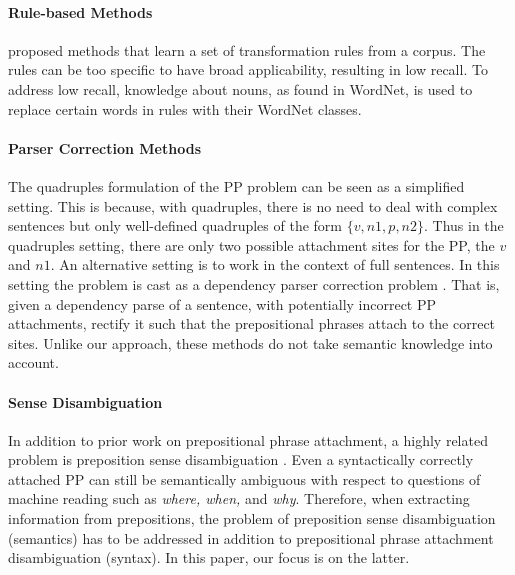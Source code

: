 \paragraph{Rule-based Methods}
\cite{BrillR94}  proposed methods that
 learn  a set of transformation rules from a corpus. 
The rules can be too  specific to have broad applicability, resulting in low recall. 
To address low recall, knowledge about nouns, as found in  WordNet,   is used to replace certain
words in rules with  their WordNet classes. 


\paragraph{Parser Correction Methods}
The  quadruples formulation of the PP problem  can be seen as a simplified setting. This is because, with quadruples,  there is no need to deal with complex sentences but only well-defined quadruples of the form $\{v,n1,p,n2\}$. Thus in the quadruples setting, there are only two possible attachment sites for the PP, the $v$ and $n1$.  An alternative setting is to  work in the context of full sentences. In this setting the problem is cast as a dependency parser correction problem \cite{AttererS07,Agirre08,AnguianoC11}. That is, given a dependency parse of a sentence, with potentially incorrect PP attachments, rectify it such that the prepositional phrases attach to the correct sites. Unlike our approach, these methods do not take semantic knowledge into account.

\paragraph{Sense Disambiguation}
In addition to prior work on prepositional phrase attachment, a highly related problem is preposition sense disambiguation \cite{Hovy2011,SrikumarR13}.  Even a
syntactically correctly attached PP can  still  be semantically ambiguous with respect to questions of machine reading such as \textit{where, when,} and \textit{why}. 
Therefore, when extracting information from prepositions, the problem of preposition sense disambiguation (semantics) has to be addressed in addition to prepositional phrase attachment disambiguation (syntax). In this paper, our focus is on the latter. 
